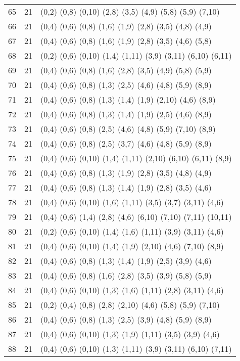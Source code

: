 {\begin{longtable}{lll}
65  & 21 & (0,2) (0,8) (0,10) (2,8) (3,5) (4,9) (5,8) (5,9) (7,10) \\
66  & 21 & (0,4) (0,6) (0,8) (1,6) (1,9) (2,8) (3,5) (4,8) (4,9) \\
67  & 21 & (0,4) (0,6) (0,8) (1,6) (1,9) (2,8) (3,5) (4,6) (5,8) \\
68  & 21 & (0,2) (0,6) (0,10) (1,4) (1,11) (3,9) (3,11) (6,10) (6,11) \\
69  & 21 & (0,4) (0,6) (0,8) (1,6) (2,8) (3,5) (4,9) (5,8) (5,9) \\
70  & 21 & (0,4) (0,6) (0,8) (1,3) (2,5) (4,6) (4,8) (5,9) (8,9) \\
71  & 21 & (0,4) (0,6) (0,8) (1,3) (1,4) (1,9) (2,10) (4,6) (8,9) \\
72  & 21 & (0,4) (0,6) (0,8) (1,3) (1,4) (1,9) (2,5) (4,6) (8,9) \\
73  & 21 & (0,4) (0,6) (0,8) (2,5) (4,6) (4,8) (5,9) (7,10) (8,9) \\
74  & 21 & (0,4) (0,6) (0,8) (2,5) (3,7) (4,6) (4,8) (5,9) (8,9) \\
75  & 21 & (0,4) (0,6) (0,10) (1,4) (1,11) (2,10) (6,10) (6,11) (8,9) \\
76  & 21 & (0,4) (0,6) (0,8) (1,3) (1,9) (2,8) (3,5) (4,8) (4,9) \\
77  & 21 & (0,4) (0,6) (0,8) (1,3) (1,4) (1,9) (2,8) (3,5) (4,6) \\
78  & 21 & (0,4) (0,6) (0,10) (1,6) (1,11) (3,5) (3,7) (3,11) (4,6) \\
79  & 21 & (0,4) (0,6) (1,4) (2,8) (4,6) (6,10) (7,10) (7,11) (10,11) \\
80  & 21 & (0,2) (0,6) (0,10) (1,4) (1,6) (1,11) (3,9) (3,11) (4,6) \\
81  & 21 & (0,4) (0,6) (0,10) (1,4) (1,9) (2,10) (4,6) (7,10) (8,9) \\
82  & 21 & (0,4) (0,6) (0,8) (1,3) (1,4) (1,9) (2,5) (3,9) (4,6) \\
83  & 21 & (0,4) (0,6) (0,8) (1,6) (2,8) (3,5) (3,9) (5,8) (5,9) \\
84  & 21 & (0,4) (0,6) (0,10) (1,3) (1,6) (1,11) (2,8) (3,11) (4,6) \\
85  & 21 & (0,2) (0,4) (0,8) (2,8) (2,10) (4,6) (5,8) (5,9) (7,10) \\
86  & 21 & (0,4) (0,6) (0,8) (1,3) (2,5) (3,9) (4,8) (5,9) (8,9) \\
87  & 21 & (0,4) (0,6) (0,10) (1,3) (1,9) (1,11) (3,5) (3,9) (4,6) \\
88  & 21 & (0,4) (0,6) (0,10) (1,3) (1,11) (3,9) (3,11) (6,10) (7,11) \\

\end{longtable}}
